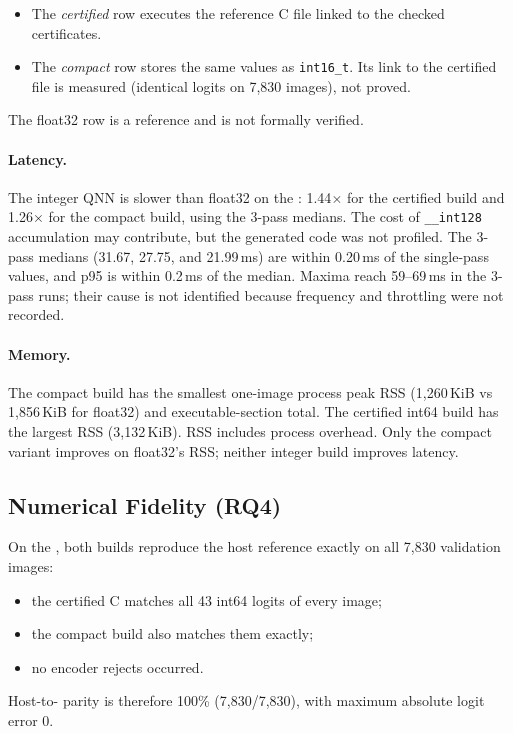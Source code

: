 \begin{itemize}
  \item The \emph{certified} row executes the reference C file linked to the checked certificates.
  \item The \emph{compact} row stores the same values as \texttt{int16\_t}. Its link to the certified file is measured (identical logits on 7,830 images), not proved.
\end{itemize}
The float32 row is a reference and is not formally verified.





\paragraph{Latency.}
The integer QNN is slower than float32 on the \Aseven{}: 1.44$\times$ for the certified build and 1.26$\times$ for the compact build, using the 3-pass medians. The cost of \texttt{\_\_int128} accumulation may contribute, but the generated code was not profiled. The 3-pass medians (31.67, 27.75, and 21.99\,ms) are within 0.20\,ms of the single-pass values, and p95 is within 0.2\,ms of the median. Maxima reach 59--69\,ms in the 3-pass runs; their cause is not identified because frequency and throttling were not recorded.

\paragraph{Memory.}
The compact build has the smallest one-image process peak RSS (1,260\,KiB vs 1,856\,KiB for float32) and executable-section total. The certified int64 build has the largest RSS (3,132\,KiB). RSS includes process overhead. Only the compact variant improves on float32's RSS; neither integer build improves latency.



\subsection{Numerical Fidelity (RQ4)}
On the \Aseven{}, both builds reproduce the host reference exactly on all 7,830 validation images:
\begin{itemize}
  \item the certified C matches all 43 int64 logits of every image;
  \item the compact build also matches them exactly;
  \item no encoder rejects occurred.
\end{itemize}
Host-to-\Aseven{} parity is therefore 100\% (7,830/7,830), with maximum absolute logit error 0.



